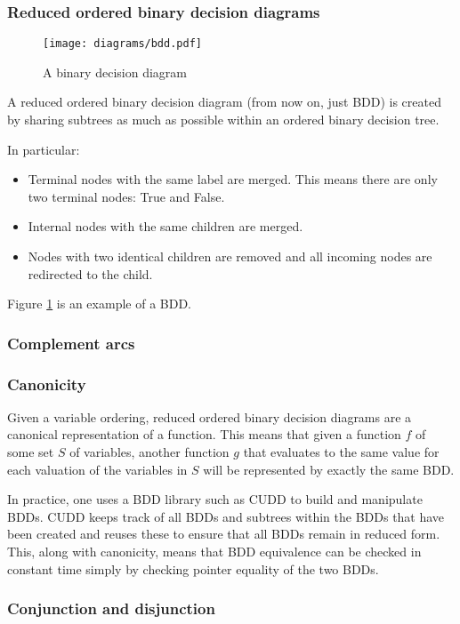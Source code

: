 \subsubsection{Reduced ordered binary decision diagrams}

\begin{figure}[t]
\centering
\texttt{[image: diagrams/bdd.pdf]}
\caption{A binary decision diagram}
\label{fig:bdd}
\end{figure}

A reduced ordered binary decision diagram (from now on, just BDD) is created by sharing subtrees as much as possible within an ordered binary decision tree.

In particular: 
\begin{itemize}
    \item Terminal nodes with the same label are merged. This means there are only two terminal nodes: True and False.
    \item Internal nodes with the same children are merged.
    \item Nodes with two identical children are removed and all incoming nodes are redirected to the child.
\end{itemize}

Figure \ref{fig:bdd} is an example of a BDD.

\subsubsection{Complement arcs}

\subsubsection{Canonicity}
Given a variable ordering, reduced ordered binary decision diagrams are a canonical representation of a function. This means that given a function $f$ of some set $S$ of variables, another function $g$ that evaluates to the same value for each valuation of the variables in $S$ will be represented by exactly the same BDD.

In practice, one uses a BDD library such as CUDD \cite{cudd} to build and manipulate BDDs. CUDD keeps track of all BDDs and subtrees within the BDDs that have been created and reuses these to ensure that all BDDs remain in reduced form. This, along with canonicity, means that BDD equivalence can be checked in constant time simply by checking pointer equality of the two BDDs.

\subsubsection{Conjunction and disjunction}

